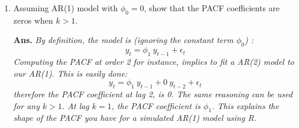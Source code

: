 \documentclass[a4paper,11pt,oneside,onecolumn]{book}
\begin{document}
\begin{enumerate}

\item Assuming AR(1) model with $\phi_0=0$, show that the PACF coefficients are zeros when $k>1$.\\
\vspace{.3cm}

\textbf{Ans.}\textit{
By definition, the model is (ignoring the constant term $\phi_0$) :
$$
y_t=\phi_1\ y_{t-1}+\epsilon_t
$$
Computing the PACF at order 2 for instance, implies to fit a AR(2) model to our AR(1).
This is easily done: 
$$
y_t=\phi_1\ y_{t-1}+0\ y_{t-2}+\epsilon_t
$$
therefore the PACF coefficient at lag 2, is 0.
The same reasoning can be used for any $k>1$.
At lag $k=1$, the PACF coefficient is $\phi_1$.
This explains the  shape of the PACF you have for a simulated AR(1) model using R.
}
\vspace{.3cm}




\end{enumerate}
\end{document}
